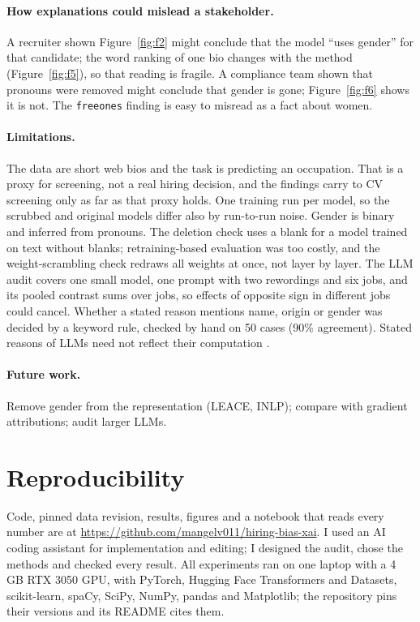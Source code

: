\documentclass[11pt]{article}
\begin{document}
\paragraph{How explanations could mislead a stakeholder.} A recruiter shown Figure~\ref{fig:f2} might conclude that the model ``uses gender'' for that candidate; the word ranking of one bio changes with the method (Figure~\ref{fig:f5}), so that reading is fragile. A compliance team shown that pronouns were removed might conclude that gender is gone; Figure~\ref{fig:f6} shows it is not. The \texttt{freeones} finding is easy to misread as a fact about women.

\paragraph{Limitations.} The data are short web bios and the task is predicting an occupation. That is a proxy for screening, not a real hiring decision, and the findings carry to CV screening only as far as that proxy holds. One training run per model, so the scrubbed and original models differ also by run-to-run noise. Gender is binary and inferred from pronouns. The deletion check uses a blank for a model trained on text without blanks; retraining-based evaluation \citep{hooker2019benchmark} was too costly, and the weight-scrambling check redraws all weights at once, not layer by layer. The LLM audit covers one small model, one prompt with two rewordings and six jobs, and its pooled contrast sums over jobs, so effects of opposite sign in different jobs could cancel. Whether a stated reason mentions name, origin or gender was decided by a keyword rule, checked by hand on 50 cases (90\% agreement). Stated reasons of LLMs need not reflect their computation \citep{turpin2023language}.

\paragraph{Future work.} Remove gender from the representation (LEACE, INLP); compare with gradient attributions; audit larger LLMs.

\FloatBarrier
\section*{Reproducibility}
Code, pinned data revision, results, figures and a notebook that reads every number are at \url{https://github.com/mangelv011/hiring-bias-xai}. I used an AI coding assistant for implementation and editing; I designed the audit, chose the methods and checked every result. All experiments ran on one laptop with a 4 GB RTX 3050 GPU, with PyTorch, Hugging Face Transformers and Datasets, scikit-learn, spaCy, SciPy, NumPy, pandas and Matplotlib; the repository pins their versions and its README cites them.

{\footnotesize }
\end{document}
